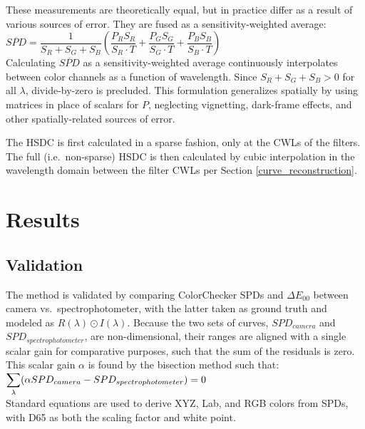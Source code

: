 \documentclass[twocolumn,10pt]{asme2ej}
\newcommand{\id}{\hspace{6 mm}}
\begin{document}
These measurements are theoretically equal, but in practice differ as a result of various sources of error. They are fused as a sensitivity-weighted average: \\

$\overline{SPD} = \dfrac{1}{S_R+S_G+S_B} \left( \dfrac{P_R S_R}{S_R \cdot T} + \dfrac{P_G S_G}{S_G \cdot T} + \dfrac{P_B S_B}{S_B \cdot T} \right)$\\

Calculating $\overline{SPD}$ as a sensitivity-weighted average continuously interpolates between color channels as a function of wavelength. Since $S_R+S_G+S_B > 0$ for all $\lambda$, divide-by-zero is precluded. This formulation generalizes spatially by using matrices in place of scalars for $P$, neglecting vignetting, dark-frame effects, and other spatially-related sources of error.

\id The HSDC is first calculated in a sparse fashion, only at the CWLs of the filters. The full (i.e.\ non-sparse) HSDC is then calculated by cubic interpolation in the wavelength domain between the filter CWLs per Section \ref{curve_reconstruction}.

\section{Results}
\subsection{Validation}
\label{validation}

The method is validated by comparing ColorChecker SPDs and $\Delta E_{00}$ between camera vs.\ spectrophotometer, with the latter taken as ground truth and modeled as $R(\lambda) \odot I(\lambda)$. Because the two sets of curves, $SPD_{camera}$ and $SPD_{spectrophotometer}$, are non-dimensional, their ranges are aligned with a single scalar gain for comparative purposes, such that the sum of the residuals is zero. This scalar gain $\alpha$ is found by the bisection method such that:\\

$\mathlarger{ \sum_{\lambda}} ( \alpha SPD_{camera}- SPD_{spectrophotometer} )=0$ \\

Standard equations are used to derive XYZ, Lab, and RGB colors from SPDs, with D65 as both the scaling factor and white point. \cite{Lindbloom}
\end{document}
